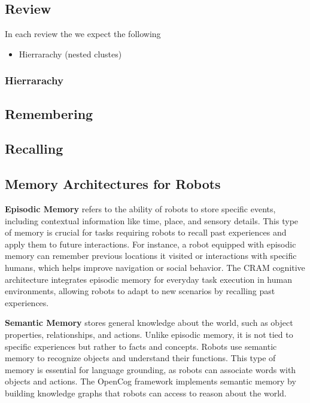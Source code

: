     \subsection{Review}
        In each review the we expect the following
        \begin{itemize}
            \item Hierrarachy (nested clustes)
        \end{itemize}
        \subsubsection{Hierrarachy}


    \subsection{Remembering}

    \subsection{Recalling}




    \subsection{Memory Architectures for Robots}
        \textbf{Episodic Memory} refers to the ability of robots to store specific events, including contextual information like time, place, and sensory details. This type of memory is crucial for tasks requiring robots to recall past experiences and apply them to future interactions. For instance, a robot equipped with episodic memory can remember previous locations it visited or interactions with specific humans, which helps improve navigation or social behavior. The CRAM cognitive architecture integrates episodic memory for everyday task execution in human environments, allowing robots to adapt to new scenarios by recalling past experiences.
    
        \textbf{Semantic Memory} stores general knowledge about the world, such as object properties, relationships, and actions. Unlike episodic memory, it is not tied to specific experiences but rather to facts and concepts. Robots use semantic memory to recognize objects and understand their functions. This type of memory is essential for language grounding, as robots can associate words with objects and actions. The OpenCog framework implements semantic memory by building knowledge graphs that robots can access to reason about the world.
    
